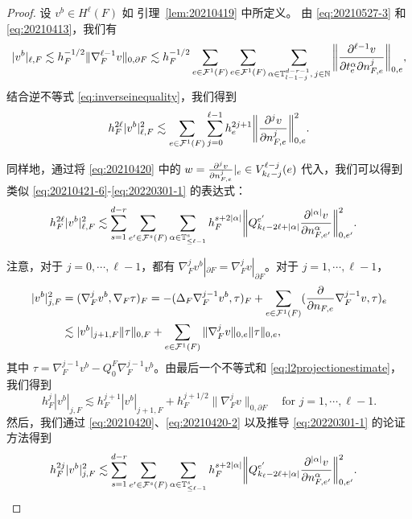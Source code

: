 \begin{proof}
设 $v^b\in H^{\ell}(F)$ 如 引理~\ref{lem:20210419} 中所定义。
由 \eqref{eq:20210527-3} 和 \eqref{eq:20210413}，我们有
$$
|v^b|_{\ell,F}\lesssim h_F^{-1/2}\|\nabla_F^{\ell-1}v\|_{0,\partial F}\lesssim
h_F^{-1/2}\sum_{e\in\mathcal F^1(F)}\sum_{e\in\mathcal F^1(F)}\sum_{\alpha\in
\mathbb{T}^{d-r-1}_{l-1-j},\, j\in\mathbb N}\bigg\|\frac{\partial^{\ell-1}v}{\partial t_{e}^{\alpha}\partial n_{F,e}^{j}}\bigg\|_{0,e},
$$
结合逆不等式 \eqref{eq:inverseinequality}，我们得到
$$
h_F^{2\ell}|v^b|_{\ell,F}^2\lesssim \sum_{e\in\mathcal F^1(F)}\sum_{j=0}^{\ell-1}h_e^{2j+1}\bigg\|\frac{\partial^{j}v}{\partial n_{F,e}^{j}}\bigg\|_{0,e}^2.
$$

同样地，通过将 \eqref{eq:20210420} 中的 $w=\frac{\partial^{j}v}{\partial n_{F,e}^{j}}|_e\in V_{k_{\ell}-j}^{\ell-j}(e)$ 代入，我们可以得到类似 \eqref{eq:20210421-6}-\eqref{eq:20220301-1} 的表达式：
\begin{align}
h_F^{2\ell}|v^b|_{\ell,F}^2&\lesssim  \sum_{s=1}^{d-r}\sum_{e'\in\mathcal
F^{s}(F)}\sum_{\alpha\in \mathbb{T}^{s}_{\leq \ell-1}}h_F^{s+2|\alpha|}\bigg\|Q_{k_{\ell}-2\ell+|\alpha|}^{e'}\frac{\partial^{|\alpha|}v}{\partial n_{F,e'}^{\alpha}}\bigg\|_{0,e'}^2. \label{eq:20210420-2}
\end{align}

注意，对于 $j=0,\cdots, \ell-1$，都有 $\nabla_F^j v^b|_{\partial F}=\nabla_F^j v|_{\partial F}$。对于 $j=1,\cdots, \ell-1$，
\begin{align*}
|v^b|_{j,F}^2&=(\nabla_F^jv^b, \nabla_F\tau)_F =-(\Delta_F\nabla_F^{j-1}v^b, \tau)_F +\sum_{e\in\mathcal F^1(F)}(\frac{\partial}{\partial n_{F,e}}\nabla_F^{j-1}v, \tau)_{e} \\
&\lesssim |v^b|_{j+1,F}\|\tau\|_{0,F} +\sum_{e\in\mathcal F^1(F)}\|\nabla_F^{j}v\|_{0,e}\|\tau\|_{0,e},
\end{align*}
其中 $\tau=\nabla_F^{j-1}v^b-Q_0^F\nabla_F^{j-1}v^b$。由最后一个不等式和 \eqref{eq:l2projectionestimate}，我们得到
$$
h_F^{j}|v^b|_{j,F}\lesssim
h_F^{j+1}|v^b|_{j+1,F}+h_F^{j+1/2}\|\nabla_F^{j}v\|_{0,\partial F} \quad \text{
for } j=1,\cdots, \ell-1.
$$
然后，我们通过 \eqref{eq:20210420}、\eqref{eq:20210420-2} 以及推导 \eqref{eq:20220301-1} 的论证方法得到
\begin{align}
h_F^{2j}|v^b|_{j,F}^2&\lesssim \sum_{s=1}^{d-r}\sum_{e'\in\mathcal
F^{s}(F)}\sum_{\alpha\in \mathbb{T}^{s}_{\leq
\ell-1}}h_F^{s+2|\alpha|}\bigg\|Q_{k_{\ell}-2\ell+|\alpha|}^{e'}\frac{\partial^{|\alpha|}v}{\partial
n_{F,e'}^{\alpha}}\bigg\|_{0,e'}^2  \label{eq:20210420-3}.
\end{align}


\end{proof}
